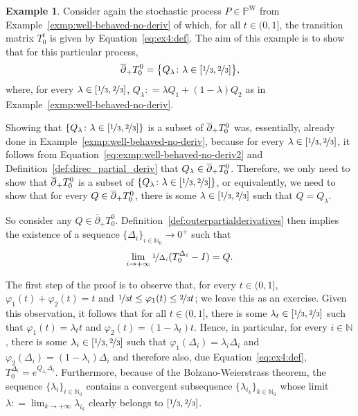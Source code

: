 \documentclass[10pt,a4paper]{paper}
\theoremstyle{definition}
\newtheorem{exmp}{Example}%
\newcommand{\nats}{\mathbb{N}}
\newcommand{\processes}{\mathbb{P}}
\newcommand{\wprocesses}{\processes^{\mathrm{W}}}
\newcommand{\coloneqq}{:\!=}
\begin{document}
\begin{exmp}\label{exmp:outerderivative}
Consider again the stochastic process $P\in\wprocesses$ from Example~\ref{exmp:well-behaved-no-deriv} of which, for all $t\in(0,1]$, the transition matrix $T_0^t$ is given by Equation~\eqref{eq:ex4:def}. 
The aim of this example is to show that for this particular process,
\begin{equation*}
\smash{\overline{\partial}}_+T_0^0=\big\{Q_\lambda\colon \lambda\in[\nicefrac{1}{3},\nicefrac{2}{3}]\big\},
\end{equation*}
where, for every $\lambda\in[\nicefrac{1}{3},\nicefrac{2}{3}]$, $Q_\lambda\coloneqq\lambda Q_1+(1-\lambda)Q_2$ as in Example~\ref{exmp:well-behaved-no-deriv}.

Showing that $\{Q_\lambda\colon \lambda\in[\nicefrac{1}{3},\nicefrac{2}{3}]\}$ is a subset of $\smash{\overline{\partial}}_+T_0^0$ was, essentially, already done in Example~\ref{exmp:well-behaved-no-deriv}, because for every $\lambda\in[\nicefrac{1}{3},\nicefrac{2}{3}]$, it follows from Equation~\eqref{eq:exmp:well-behaved-no-deriv2} and Definition~\ref{def:direc_partial_deriv} that $Q_\lambda\in\smash{\overline{\partial}}_+T_0^0$. Therefore, we only need to show that $\smash{\overline{\partial}}_+T_0^0$ is a subset of $\{Q_\lambda\colon \lambda\in[\nicefrac{1}{3},\nicefrac{2}{3}]\}$, or equivalently, we need to show that for every $Q\in\smash{\overline{\partial}}_+T_0^0$, there is some $\lambda\in[\nicefrac{1}{3},\nicefrac{2}{3}]$ such that $Q=Q_\lambda$.

So consider any $Q\in\overline{\partial}_+T_0^0$. Definition~\ref{def:outerpartialderivatives} then implies the existence of a sequence $\{\Delta_i\}_{i\in\nats_0}\to 0^+$ such that 
\begin{equation}\label{eq:exmp:outerderivative}
\lim_{i\to+\infty}\nicefrac{1}{\Delta_i}(T_0^{\Delta_i}-I)=Q.
\end{equation}

The first step of the proof is to observe that, for every $t\in(0,1]$, $\varphi_1(t)+\varphi_2(t)=t$ and $\nicefrac{1}{3}t\leq\varphi_1(t)\leq\nicefrac{2}{3}t$; we leave this as an exercise. Given this observation, it follows that for all $t\in(0,1]$, there is some $\lambda_t\in[\nicefrac{1}{3},\nicefrac{2}{3}]$ such that $\varphi_1(t)=\lambda_t t$ and $\varphi_2(t)=(1-\lambda_t)t$. Hence, in particular, for every $i\in\nats$, there is some $\lambda_i\in[\nicefrac{1}{3},\nicefrac{2}{3}]$ such that $\varphi_1(\Delta_i)=\lambda_i \Delta_i$ and $\varphi_2(\Delta_i)=(1-\lambda_i)\Delta_i$ and therefore also, due Equation~\eqref{eq:ex4:def}, $T_0^{\Delta_i}=e^{Q_{\lambda_i}\Delta_i}$.
Furthermore, because of the Bolzano-Weierstrass theorem, the sequence $\{\lambda_i\}_{i\in\nats_0}$ contains a convergent subsequence $\{\lambda_{i_k}\}_{k\in\nats_0}$ whose limit $\lambda\coloneqq\lim_{k\to+\infty}\lambda_{i_k}$ clearly belongs to $[\nicefrac{1}{3},\nicefrac{2}{3}]$. 


\end{exmp}
\end{document}
